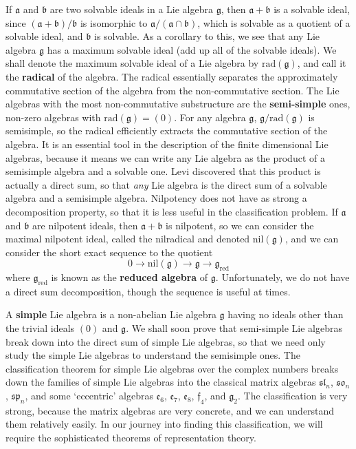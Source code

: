 If $\mathfrak{a}$ and $\mathfrak{b}$ are two solvable ideals in a Lie algebra $\mathfrak{g}$, then $\mathfrak{a} + \mathfrak{b}$ is a solvable ideal, since $(\mathfrak{a} + \mathfrak{b})/\mathfrak{b}$ is isomorphic to $\mathfrak{a}/(\mathfrak{a} \cap \mathfrak{b})$, which is solvable as a quotient of a solvable ideal, and $\mathfrak{b}$ is solvable. As a corollary to this, we see that any Lie algebra $\mathfrak{g}$ has a maximum solvable ideal (add up all of the solvable ideals). We shall denote the maximum solvable ideal of a Lie algebra by $\text{rad}(\mathfrak{g})$, and call it the {\bf radical} of the algebra. The radical essentially separates the approximately commutative section of the algebra from the non-commutative section. The Lie algebras with the most non-commutative substructure are the {\bf semi-simple} ones, non-zero algebras with $\text{rad}(\mathfrak{g}) = (0)$. For any algebra $\mathfrak{g}$, $\mathfrak{g}/\text{rad}(\mathfrak{g})$ is semisimple, so the radical efficiently extracts the commutative section of the algebra. It is an essential tool in the description of the finite dimensional Lie algebras, because it means we can write any Lie algebra as the product of a semisimple algebra and a solvable one. Levi discovered that this product is actually a direct sum, so that {\it any} Lie algebra is the direct sum of a solvable algebra and a semisimple algebra. Nilpotency does not have as strong a decomposition property, so that it is less useful in the classification problem. If $\mathfrak{a}$ and $\mathfrak{b}$ are nilpotent ideals, then $\mathfrak{a} + \mathfrak{b}$ is nilpotent, so we can consider the maximal nilpotent ideal, called the nilradical and denoted $\text{nil}(\mathfrak{g})$, and we can consider the short exact sequence to the quotient
%
\[ 0 \to \text{nil}(\mathfrak{g}) \to \mathfrak{g} \to \mathfrak{g}_{\text{red}} \]
%
where $\mathfrak{g}_{\text{red}}$ is known as the {\bf reduced algebra} of $\mathfrak{g}$. Unfortunately, we do not have a direct sum decomposition, though the sequence is useful at times.

A {\bf simple} Lie algebra is a non-abelian Lie algebra $\mathfrak{g}$ having no ideals other than the trivial ideals $(0)$ and $\mathfrak{g}$. We shall soon prove that semi-simple Lie algebras break down into the direct sum of simple Lie algebras, so that we need only study the simple Lie algebras to understand the semisimple ones. The classification theorem for simple Lie algebras over the complex numbers breaks down the families of simple Lie algebras into the classical matrix algebras $\mathfrak{sl}_n$, $\mathfrak{so}_n$, $\mathfrak{sp}_n$, and some `eccentric' algebras $\mathfrak{e}_6$, $\mathfrak{e}_7$, $\mathfrak{e}_8$, $\mathfrak{f}_4$, and $\mathfrak{g}_2$. The classification is very strong, because the matrix algebras are very concrete, and we can understand them relatively easily. In our journey into finding this classification, we will require the sophisticated theorems of representation theory.



